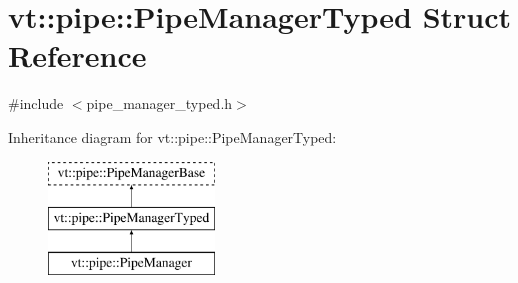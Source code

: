 \hypertarget{structvt_1_1pipe_1_1_pipe_manager_typed}{}\section{vt\+:\+:pipe\+:\+:Pipe\+Manager\+Typed Struct Reference}
\label{structvt_1_1pipe_1_1_pipe_manager_typed}


{\ttfamily \#include $<$pipe\+\_\+manager\+\_\+typed.\+h$>$}

Inheritance diagram for vt\+:\+:pipe\+:\+:Pipe\+Manager\+Typed\+:\begin{figure}[H]
\begin{center}
\leavevmode
\includegraphics[height=3.000000cm]{structvt_1_1pipe_1_1_pipe_manager_typed}
\end{center}
\end{figure}
